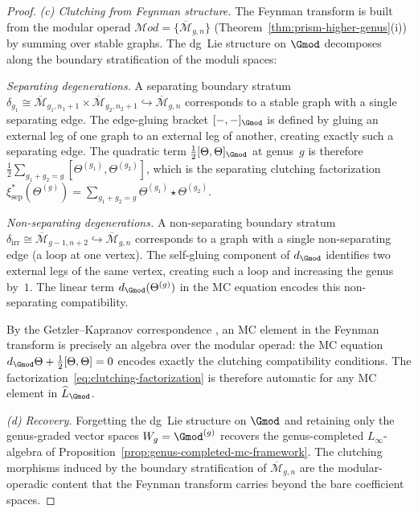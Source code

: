 \begin{proof}
\emph{(c) Clutching from Feynman structure.}
The Feynman transform is built from the modular operad
$\mathcal{M}od = \{\overline{\mathcal{M}}_{g,n}\}$
(Theorem~\ref{thm:prism-higher-genus}(i)) by summing
over stable graphs.  The dg~Lie structure on $\Gmod$
decomposes along the boundary stratification of the moduli spaces:

\emph{Separating degenerations.}
A separating boundary stratum
$\delta_{g_1} \cong
\overline{\mathcal{M}}_{g_1,n_1+1} \times
\overline{\mathcal{M}}_{g_2,n_2+1}
\hookrightarrow \overline{\mathcal{M}}_{g,n}$
corresponds to a stable graph with a single separating edge.
The edge-gluing bracket $[-,-]_{\Gmod}$ is defined by
gluing an external leg of one graph to an external leg of
another, creating exactly such a separating edge.
The quadratic term $\frac{1}{2}[\Theta,\Theta]_{\Gmod}$
at genus~$g$ is therefore
$\frac{1}{2}\sum_{g_1+g_2=g}
[\Theta^{(g_1)}, \Theta^{(g_2)}]$,
which is the separating clutching factorization
$\xi_{\mathrm{sep}}^*(\Theta^{(g)}) =
\sum_{g_1+g_2=g}
\Theta^{(g_1)} \star \Theta^{(g_2)}$.

\emph{Non-separating degenerations.}
A non-separating boundary stratum
$\delta_{\mathrm{irr}} \cong
\overline{\mathcal{M}}_{g-1,n+2}
\hookrightarrow \overline{\mathcal{M}}_{g,n}$
corresponds to a graph with a single non-separating edge
(a loop at one vertex).  The self-gluing component of
$d_{\Gmod}$ identifies two external legs of the same vertex,
creating such a loop and increasing the genus by~$1$.
The linear term $d_{\Gmod}(\Theta^{(g)})$ in the MC equation
encodes this non-separating compatibility.

By the Getzler--Kapranov correspondence
\cite[Theorem~5.4]{GeK98}, an MC element in the Feynman
transform is precisely an algebra over the modular operad:
the MC equation $d_{\Gmod}\Theta + \frac{1}{2}[\Theta,\Theta] = 0$
encodes exactly the clutching compatibility conditions.
The factorization~\eqref{eq:clutching-factorization} is
therefore automatic for any MC element in
$\widehat{L}_{\Gmod}$.

\emph{(d) Recovery.}
Forgetting the dg~Lie structure on $\Gmod$ and retaining only
the genus-graded vector spaces $W_g = {\Gmod}^{(g)}$ recovers the
genus-completed $L_\infty$-algebra of
Proposition~\ref{prop:genus-completed-mc-framework}.
The clutching morphisms induced by the boundary stratification
of $\overline{\mathcal{M}}_{g,n}$ are the modular-operadic
content that the Feynman transform carries beyond the bare
coefficient spaces.
\end{proof}

